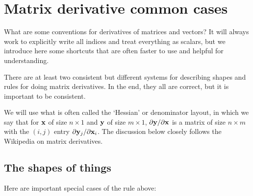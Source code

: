 \section{Matrix derivative common cases}

What are some conventions for derivatives of matrices and vectors?  It
will always work to explicitly write all indices and treat everything
as scalars, but we introduce here some shortcuts that are often faster
to use and helpful for understanding.

There are at least two consistent but different systems for describing
shapes and rules for doing matrix derivatives.  In the end, they all
are correct, but it is important to be consistent.

\newcommand{\av}{{\bf a}}
\newcommand{\xv}{{\bf x}}
\newcommand{\yv}{{\bf y}}
\newcommand{\uv}{{\bf u}}
\newcommand{\vv}{{\bf v}}
\newcommand{\fv}{{\bf f}}
\newcommand{\gv}{{\bf g}}
\newcommand{\am}{{\bf A}}
\newcommand{\xm}{{\bf X}}
\newcommand{\ym}{{\bf Y}}

We will use what is often called the `Hessian' or denominator layout,
in which we say that 
for $\xv$ of size $n\times 1$ and $\yv$ of size $m\times 1$,
  $\partial \yv/\partial \xv$ is a matrix of size $n\times m$ with the
  $(i, j)$ entry $\partial \yv_j/\partial \xv_i$.  The discussion
  below closely follows the Wikipedia on matrix derivatives.

\subsection{The shapes of things}
Here are important special cases of the rule above:

